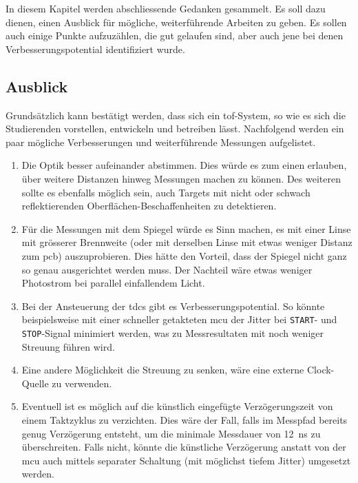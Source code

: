 In diesem Kapitel werden abschliessende Gedanken gesammelt. Es soll dazu dienen, einen Ausblick für mögliche,
weiterführende Arbeiten zu geben. Es sollen auch einige Punkte aufzuzählen, die gut gelaufen sind, aber auch jene bei
denen Verbesserungspotential identifiziert wurde.

\subsection{Ausblick}\label{sec:ausblick}

Grundsätzlich kann bestätigt werden, dass sich ein \acrshort{tof}-System, so wie es sich die Studierenden vorstellen,
entwickeln und betreiben lässt. Nachfolgend werden ein paar mögliche Verbesserungen und weiterführende Messungen
aufgelistet.

\begin{enumerate}
    \item Die Optik besser aufeinander abstimmen. Dies würde es zum einen erlauben, über weitere Distanzen hinweg
          Messungen machen zu können. Des weiteren sollte es ebenfalls möglich sein, auch Targets mit nicht oder schwach
          reflektierenden Oberflächen-Beschaffenheiten zu detektieren.
    \item Für die Messungen mit dem Spiegel würde es Sinn machen, es mit einer Linse mit grösserer Brennweite (oder mit
          derselben Linse mit etwas weniger Distanz zum \acrshort{pcb}) auszuprobieren. Dies hätte den Vorteil, dass der
          Spiegel nicht ganz so genau ausgerichtet werden muss. Der Nachteil wäre etwas weniger Photostrom bei parallel
          einfallendem Licht.
    \item Bei der Ansteuerung der \acrshort{tdc}s gibt es Verbesserungspotential. So könnte beispielsweise mit einer
          schneller getakteten \acrshort{mcu} der Jitter bei \lstinline|START|- und \lstinline|STOP|-Signal minimiert
          werden, was zu Messresultaten mit noch weniger Streuung führen wird.
    \item Eine andere Möglichkeit die Streuung zu senken, wäre eine externe Clock-Quelle zu verwenden.
    \item Eventuell ist es möglich auf die künstlich eingefügte Verzögerungszeit von einem Taktzyklus zu verzichten.
          Dies wäre der Fall, falls im Messpfad bereits genug Verzögerung entsteht, um die minimale Messdauer von 12~ns
          zu überschreiten. Falls nicht, könnte die künstliche Verzögerung anstatt von der \acrshort{mcu} auch mittels
          separater Schaltung (mit möglichst tiefem Jitter) umgesetzt werden.

\end{enumerate}
